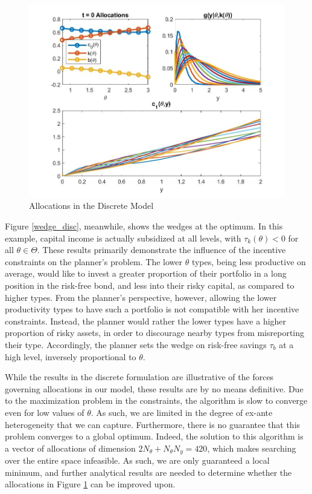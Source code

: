 \documentclass[11pt]{article}
\begin{document}
\begin{figure}[!htbp]
    \centering
    \includegraphics[scale = 0.4]{figures/allocations_10.jpg}
    \caption{Allocations in the Discrete Model}
    \label{alloc_disc}
\end{figure}

Figure \ref{wedge_disc}, meanwhile, shows the wedges at the optimum. In this example, capital income is actually subsidized at all levels, with \( \tau_k(\theta)<0 \) for all \( \theta\in\Theta \). These results primarily demonstrate the influence of the incentive constraints on the planner's problem. The lower \( \theta \) types, being less productive on average, would like to invest a greater proportion of their portfolio in a long position in the risk-free bond, and less into their risky capital, as compared to higher types. From the planner's perspective, however, allowing the lower productivity types to have such a portfolio is not compatible with her incentive constraints. Instead, the planner would rather the lower types have a higher proportion of risky assets, in order to discourage nearby types from misreporting their type. Accordingly, the planner sets the wedge on risk-free savings \( \tau_b \) at a high level, inversely proportional to \( \theta \). 

While the results in the discrete formulation are illustrative of the forces governing allocations in our model, these results are by no means definitive. Due to the maximization problem in the constraints, the algorithm is slow to converge even for low values of \( \theta \). As such, we are limited in the degree of ex-ante heterogeneity that we can capture. Furthermore, there is no guarantee that this problem converges to a global optimum. Indeed, the solution to this algorithm is a vector of allocations of dimension \( 2N_\theta + N_\theta N_y = 420 \), which makes searching over the entire space infeasible. As such, we are only guaranteed a local minimum, and further analytical results are needed to determine whether the allocations in Figure \ref{alloc_disc} can be improved upon. 
\end{document}
